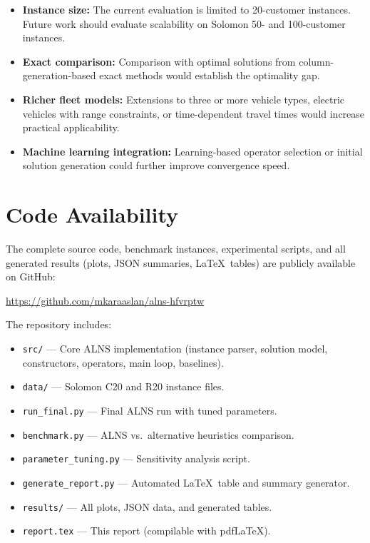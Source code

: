 \documentclass[11pt]{article}
\begin{document}
\begin{itemize}[leftmargin=*]
    \item \textbf{Instance size:} The current evaluation is limited to 20-customer instances. Future work should evaluate scalability on Solomon 50- and 100-customer instances.
    \item \textbf{Exact comparison:} Comparison with optimal solutions from column-generation-based exact methods would establish the optimality gap.
    \item \textbf{Richer fleet models:} Extensions to three or more vehicle types, electric vehicles with range constraints, or time-dependent travel times would increase practical applicability.
    \item \textbf{Machine learning integration:} Learning-based operator selection or initial solution generation could further improve convergence speed.
\end{itemize}

\section*{Code Availability}

The complete source code, benchmark instances, experimental scripts, and all generated results (plots, JSON summaries, \LaTeX\ tables) are publicly available on GitHub:

\begin{center}
\url{https://github.com/mkaraaslan/alns-hfvrptw}
\end{center}

\noindent The repository includes:
\begin{itemize}[leftmargin=*]
    \item \texttt{src/} --- Core ALNS implementation (instance parser, solution model, constructors, operators, main loop, baselines).
    \item \texttt{data/} --- Solomon C20 and R20 instance files.
    \item \texttt{run\_final.py} --- Final ALNS run with tuned parameters.
    \item \texttt{benchmark.py} --- ALNS vs.\ alternative heuristics comparison.
    \item \texttt{parameter\_tuning.py} --- Sensitivity analysis script.
    \item \texttt{generate\_report.py} --- Automated \LaTeX\ table and summary generator.
    \item \texttt{results/} --- All plots, JSON data, and generated tables.
    \item \texttt{report.tex} --- This report (compilable with pdf\LaTeX).
\end{itemize}
\end{document}
